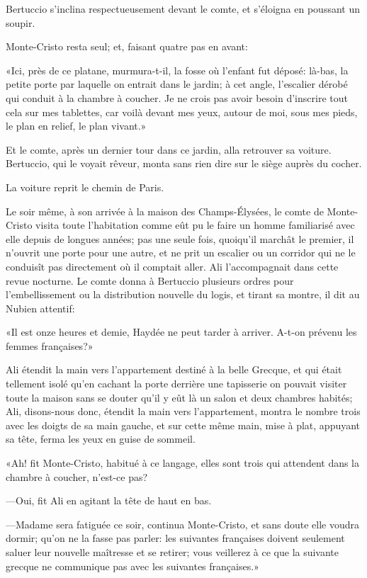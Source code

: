Bertuccio s'inclina respectueusement devant le comte, et s'éloigna en poussant un soupir. 

Monte-Cristo resta seul; et, faisant quatre pas en avant: 

«Ici, près de ce platane, murmura-t-il, la fosse où l'enfant fut déposé: là-bas, la petite porte par laquelle on entrait dans le jardin; à cet angle, l'escalier dérobé qui conduit à la chambre à coucher. Je ne crois pas avoir besoin d'inscrire tout cela sur mes tablettes, car voilà devant mes yeux, autour de moi, sous mes pieds, le plan en relief, le plan vivant.» 

Et le comte, après un dernier tour dans ce jardin, alla retrouver sa voiture. Bertuccio, qui le voyait rêveur, monta sans rien dire sur le siège auprès du cocher. 

La voiture reprit le chemin de Paris. 

Le soir même, à son arrivée à la maison des Champs-Élysées, le comte de Monte-Cristo visita toute l'habitation comme eût pu le faire un homme familiarisé avec elle depuis de longues années; pas une seule fois, quoiqu'il marchât le premier, il n'ouvrit une porte pour une autre, et ne prit un escalier ou un corridor qui ne le conduisît pas directement où il comptait aller. Ali l'accompagnait dans cette revue nocturne. Le comte donna à Bertuccio plusieurs ordres pour l'embellissement ou la distribution nouvelle du logis, et tirant sa montre, il dit au Nubien attentif: 

«Il est onze heures et demie, Haydée ne peut tarder à arriver. A-t-on prévenu les femmes françaises?» 

Ali étendit la main vers l'appartement destiné à la belle Grecque, et qui était tellement isolé qu'en cachant la porte derrière une tapisserie on pouvait visiter toute la maison sans se douter qu'il y eût là un salon et deux chambres habités; Ali, disons-nous donc, étendit la main vers l'appartement, montra le nombre trois avec les doigts de sa main gauche, et sur cette même main, mise à plat, appuyant sa tête, ferma les yeux en guise de sommeil.  

«Ah! fit Monte-Cristo, habitué à ce langage, elles sont trois qui attendent dans la chambre à coucher, n'est-ce pas? 

—Oui, fit Ali en agitant la tête de haut en bas. 

—Madame sera fatiguée ce soir, continua Monte-Cristo, et sans doute elle voudra dormir; qu'on ne la fasse pas parler: les suivantes françaises doivent seulement saluer leur nouvelle maîtresse et se retirer; vous veillerez à ce que la suivante grecque ne communique pas avec les suivantes françaises.» 

